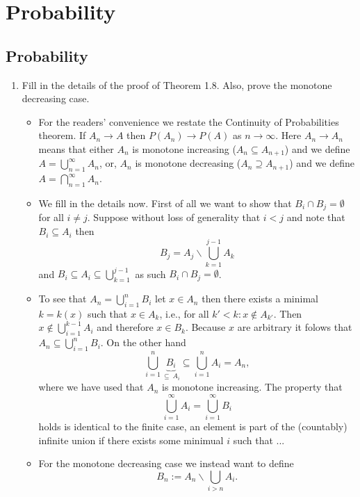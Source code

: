 \documentclass{article}
\begin{document}
\tableofcontents

\newpage

\section{Probability}
\subsection{Probability}
\begin{enumerate}
	\item Fill in the details of the proof of Theorem 1.8. Also, prove the monotone decreasing case.
		\begin{itemize}
			\item For the readers' convenience we restate the Continuity of Probabilities theorem. If $A_n \rightarrow A$ then $P(A_n) \rightarrow P(A)$ as $n \rightarrow \infty$. Here $A_n \rightarrow A_n$ means that either $A_n$ is monotone increasing ($A_n \subseteq A_{n + 1}$) and we define $A = \bigcup_{n = 1}^\infty A_n$, or, $A_n$ is monotone decreasing ($A_n \supseteq A_{n + 1}$) and we define $A = \bigcap_{n = 1}^\infty A_n$.
			\item We fill in the details now. First of all we want to show that $B_i \cap B_j = \emptyset$ for all $i \neq j$. Suppose without loss of generality that $i < j$ and note that $B_i \subseteq A_i$ then
			$$
			B_j = A_j \backslash \bigcup_{k = 1}^{j - 1} A_k
			$$
			and $B_i \subseteq A_i \subseteq \bigcup_{k = 1}^{j - 1}$ as such $B_i \cap B_j = \emptyset$.
			\item To see that $A_n = \bigcup_{i = 1}^n B_i$ let $x \in A_n$ then there exists a minimal $k = k(x)$ such that $x \in A_k$, i.e., for all $k' < k : x \notin A_{k'}$. Then $x \notin \bigcup_{i = 1}^{k - 1} A_i$ and therefore $x \in B_k$. Because $x$ are arbitrary it folows that $A_n \subseteq \bigcup_{i = 1}^n B_i$. On the other hand
			$$
			\bigcup_{i = 1}^n \underbrace{B_i}_{\subseteq\ A_i} \subseteq \bigcup_{i = 1}^n A_i = A_n,
			$$
			where we have used that $A_n$ is monotone increasing. The property that
			$$
			\bigcup_{i = 1}^\infty A_i = \bigcup_{i = 1}^\infty B_i
			$$
			holds is identical to the finite case, an element is part of the (countably) infinite union if there exists some minimual $i$ such that ...
			\item For the monotone decreasing case we instead want to define
			$$
			B_n := A_n \backslash \bigcup_{i > n} A_i.
			$$
		\end{itemize}

\end{enumerate}
\end{document}
